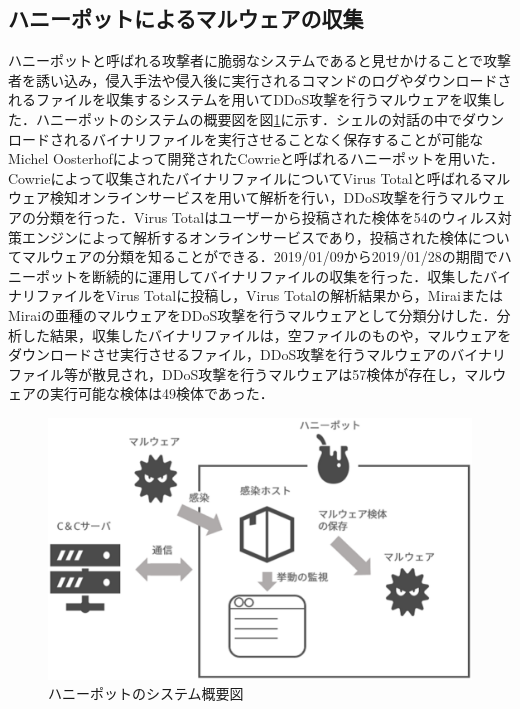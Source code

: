 \subsection{ハニーポットによるマルウェアの収集}
ハニーポットと呼ばれる攻撃者に脆弱なシステムであると見せかけることで攻撃者を誘い込み，侵入手法や侵入後に実行されるコマンドのログやダウンロードされるファイルを収集するシステムを用いてDDoS攻撃を行うマルウェアを収集した．ハニーポットのシステムの概要図を図\ref{fig:honey}に示す．シェルの対話の中でダウンロードされるバイナリファイルを実行させることなく保存することが可能なMichel Oosterhofによって開発されたCowrie\cite{Cowrie}と呼ばれるハニーポットを用いた．Cowrieによって収集されたバイナリファイルについてVirus Totalと呼ばれるマルウェア検知オンラインサービスを用いて解析を行い，DDoS攻撃を行うマルウェアの分類を行った．Virus Total\cite{Virus}はユーザーから投稿された検体を54のウィルス対策エンジンによって解析するオンラインサービスであり，投稿された検体についてマルウェアの分類を知ることができる．2019/01/09から2019/01/28の期間でハニーポットを断続的に運用してバイナリファイルの収集を行った．収集したバイナリファイルをVirus Totalに投稿し，Virus Totalの解析結果から，MiraiまたはMiraiの亜種のマルウェアをDDoS攻撃を行うマルウェアとして分類分けした．分析した結果，収集したバイナリファイルは，空ファイルのものや，マルウェアをダウンロードさせ実行させるファイル，DDoS攻撃を行うマルウェアのバイナリファイル等が散見され，DDoS攻撃を行うマルウェアは57検体が存在し，マルウェアの実行可能な検体は49検体であった．
\begin{figure}[h]
    \centering
       \includegraphics[width=120mm]{figures/honey.eps}
    \caption{ハニーポットのシステム概要図}
    \label{fig:honey}
\end{figure}


